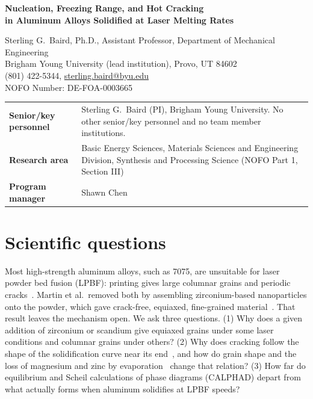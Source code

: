 \documentclass[11pt,letterpaper]{article}
\begin{document}
\thispagestyle{empty}
\begin{center}
{\Large\bfseries Nucleation, Freezing Range, and Hot Cracking\\
in Aluminum Alloys Solidified at Laser Melting Rates\par}
\vspace{14pt}
Sterling G.\ Baird, Ph.D., Assistant Professor, Department of Mechanical
Engineering\\
Brigham Young University (lead institution), Provo, UT 84602\\
(801) 422-5344, \href{mailto:sterling.baird@byu.edu}{sterling.baird@byu.edu}\\
NOFO Number: DE-FOA-0003665
\end{center}
\vspace{12pt}
\begin{tabular}{@{}>{\bfseries}p{1.8in}>{\raggedright\arraybackslash}p{4.5in}@{}}
Senior/key personnel & Sterling G.\ Baird (PI), Brigham Young University.
  No other senior/key personnel and no team member institutions. \\[4pt]
Research area & Basic Energy Sciences, Materials Sciences and Engineering
  Division, Synthesis and Processing Science (NOFO Part 1, Section III) \\[4pt]
Program manager & Shawn Chen \\
\end{tabular}

\clearpage
\setcounter{page}{1}

\section{Scientific questions}

Most high-strength aluminum alloys, such as 7075, are unsuitable for laser
powder bed fusion (LPBF): printing gives large columnar grains and periodic
cracks~\cite{martin2017}. Martin et al.\ removed both by assembling
zirconium-based nanoparticles onto the powder, which gave crack-free,
equiaxed, fine-grained material~\cite{martin2017}. That result leaves the
mechanism open. We ask three questions.
(1) Why does a given addition of zirconium or scandium give equiaxed grains
under some laser conditions and columnar grains under others?
(2) Why does cracking follow the shape of the solidification curve near its
end~\cite{kou2015}, and how do grain shape and the loss of magnesium and zinc
by evaporation~\cite{debroy2018} change that relation?
(3) How far do equilibrium and Scheil calculations of phase diagrams (CALPHAD)
depart from what actually forms when aluminum solidifies at LPBF speeds?
\end{document}
